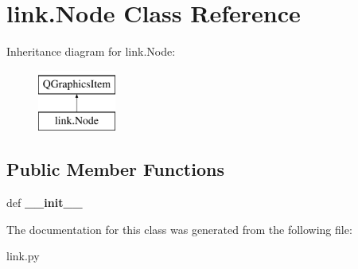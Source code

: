 \hypertarget{classlink_1_1Node}{\section{link.\-Node Class Reference}
\label{classlink_1_1Node}
}
Inheritance diagram for link.\-Node\-:\begin{figure}[H]
\begin{center}
\leavevmode
\includegraphics[height=2.000000cm]{classlink_1_1Node}
\end{center}
\end{figure}
\subsection*{Public Member Functions}
\begin{DoxyCompactItemize}
\item 
\hypertarget{classlink_1_1Node_a4c066b2ee7630a0f3252251b1e74f888}{def {\bfseries \-\_\-\-\_\-init\-\_\-\-\_\-}}\label{classlink_1_1Node_a4c066b2ee7630a0f3252251b1e74f888}

\end{DoxyCompactItemize}


The documentation for this class was generated from the following file\-:\begin{DoxyCompactItemize}
\item 
link.\-py\end{DoxyCompactItemize}
